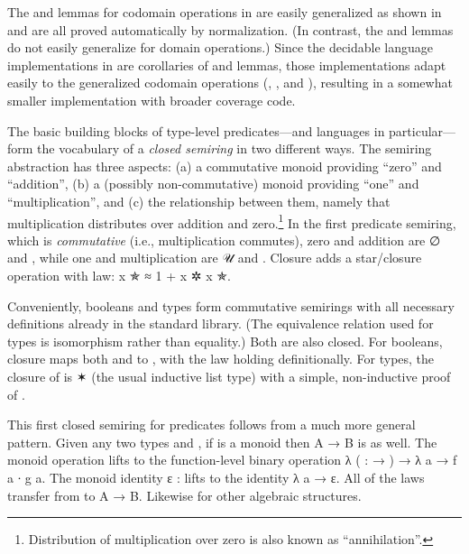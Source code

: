 \documentclass[acmsmall,screen,anonymous,timestamp]{acmart}
\begin{document}
\rnc{}
The  and  lemmas for codomain operations in  are easily generalized as shown in  and are all proved automatically by normalization.
(In contrast, the  and  lemmas do not easily generalize for domain operations.)
Since the decidable language implementations in  are corollaries of  and  lemmas, those implementations adapt easily to the generalized codomain operations (, , and ), resulting in a somewhat smaller implementation with broader coverage code.



The basic building blocks of type-level predicates---and languages in particular---form the vocabulary of a \emph{closed semiring} in two different ways.
The semiring abstraction has three aspects: (a) a commutative monoid providing ``zero'' and ``addition'', (b) a (possibly non-commutative) monoid providing ``one'' and ``multiplication'', and (c) the relationship between them, namely that multiplication distributes over addition and zero.\footnote{Distribution of multiplication over zero is also known as ``annihilation''.}
In the first predicate semiring, which is \emph{commutative} (i.e., multiplication commutes), zero and addition are \AF ∅ and , while one and multiplication are \AF 𝒰 and .
Closure adds a star/closure operation  with  law: {\AB x \AF ✯ \AF ≈ 1 \AF + \AB x \AF ✲ \AB x \AF ✯}.

Conveniently, booleans and types form commutative semirings with all necessary definitions already in the standard library.
(The equivalence relation used for types is isomorphism rather than equality.)
Both are also closed.
For booleans, closure maps both  and  to , with the  law holding definitionally.
For types, the closure of  is { ✶} (the usual inductive list type) with a simple, non-inductive proof of .

This first closed semiring for predicates follows from a much more general pattern.
Given any two types  and , if  is a monoid then {\AB A \AS → \AB B} is as well.
The monoid operation  lifts to the function-level binary operation {\AS λ (  :  \AS → ) \AS → \AS λ \AB a \AS → \AB f \AB a \AB ∙ \AB g \AB a}.
The monoid identity {\AB ε \AS : } lifts to the identity {\AS λ \AB a \AS → \AB ε}.
All of the laws transfer from  to {\AB A \AS → \AB B}.
Likewise for other algebraic structures.
\end{document}
